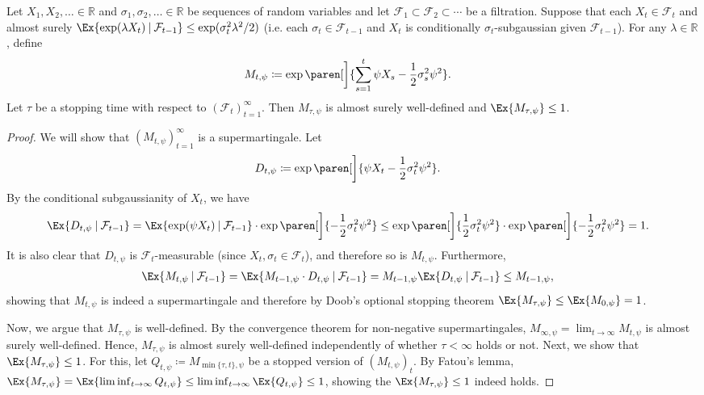 \documentclass{article}
\newcommand{\defeq}{\coloneq}
\newcommand{\Real}{\mathds{R}}
\newcommand\given[1][\delimsize]{%
  \providecommand{\delimsize}{}
  \nonscript\:#1\vert\allowbreak\nonscript\:\mathopen{}
}
\DeclarePairedDelimiter{\paren}()
\begin{document}
\begin{lemma}\label{lemma:martingale-mgf}
  Let $X_1, X_2, \dotsc \in \Real$ and
  $\sigma_1, \sigma_2, \dotsc \in \Real$ be sequences of random
  variables and let
  $\mathcal{F}_1 \subset \mathcal{F}_2 \subset \dotsb$ be a
  filtration.  Suppose that each $X_t \in \mathcal{F}_t$ and almost
  surely
  $\Ex{\exp(\lambda X_t)\given \mathcal{F}_{t-1}} \le
  \exp(\sigma_t^2\lambda^2/2)$ (i.e. each
  $\sigma_t \in \mathcal{F}_{t-1}$ and $X_t$ is conditionally
  $\sigma_t$-subgaussian given $\mathcal{F}_{t-1}$).  For any
  $\lambda\in\Real$, define
  \begin{align*}
    M_{t,\psi} &\defeq \exp\paren[\bigg]{\sum_{s=1}^t \psi X_s - \frac{1}{2}\sigma_s^2\psi^2}.
  \end{align*}
  Let $\tau$ be a stopping time with respect to
  ${(\mathcal{F}_t)}_{t=1}^\infty$.  Then $M_{\tau,\psi}$ is almost surely
  well-defined and $\Ex{M_{\tau,\psi}} \le 1$.

  \begin{proof}
    We will show that ${(M_{t,\psi})}_{t=1}^\infty$ is a
    supermartingale.  Let
    \begin{align*}
      D_{t,\psi} &\defeq \exp\paren[\bigg]{\psi X_t - \frac{1}{2}\sigma_t^2\psi^2}.
    \end{align*}
    By the conditional subgaussianity of $X_t$, we have
    \begin{align*}
      \Ex{D_{t,\psi}\given\mathcal{F}_{t-1}}
      &= \Ex{\exp(\psi X_t)\given\mathcal{F}_{t-1}}
        \cdot \exp\paren[\bigg]{-\frac{1}{2}\sigma_t^2\psi^2}
      \le \exp\paren[\bigg]{\frac{1}{2}\sigma_t^2\psi^2}
        \cdot \exp\paren[\bigg]{-\frac{1}{2}\sigma_t^2\psi^2}
      = 1.
    \end{align*}
    It is also clear that $D_{t,\psi}$ is $\mathcal{F}_t$-measurable
    (since $X_t,\sigma_t \in \mathcal{F}_t$), and therefore so is
    $M_{t,\psi}$.  Furthermore,
    \begin{align*}
      \Ex{M_{t,\psi}\given\mathcal{F}_{t-1}}
      &= \Ex{M_{t-1,\psi}\cdot D_{t,\psi}\given\mathcal{F}_{t-1}}
        = M_{t-1,\psi} \Ex{D_{t,\psi}\given\mathcal{F}_{t-1}}
        \le M_{t-1,\psi},
    \end{align*}
    showing that $M_{t,\psi}$ is indeed a supermartingale and therefore
    by Doob's optional stopping theorem
    $\Ex{M_{\tau,\psi}} \le \Ex{M_{0,\psi}} = 1$.

    Now, we argue that $M_{\tau,\psi}$ is well-defined.  By the
    convergence theorem for non-negative supermartingales,
    $M_{\infty,\psi} = \lim_{t\to\infty}M_{t,\psi}$ is almost surely
    well-defined.  Hence, $M_{\tau,\psi}$ is almost surely
    well-defined independently of whether $\tau<\infty$ holds or not.
    Next, we show that $\Ex{M_{\tau,\psi}} \le 1$.  For this, let
    $Q_{t,\psi} \defeq M_{\min\{\tau,t\},\psi}$ be a stopped
    version of ${(M_{t,\psi})}_t$.  By Fatou's lemma,
    $\Ex{M_{\tau,\psi}} = \Ex{\liminf_{t\to\infty}Q_{t,\psi}} \le
    \liminf_{t\to\infty}\Ex{Q_{t,\psi}} \le 1$, showing the
    $\Ex{M_{\tau,\psi}} \le 1$ indeed holds.
  \end{proof}
\end{lemma}
\end{document}
